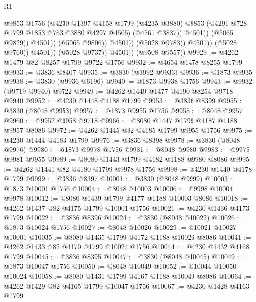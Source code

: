 \begin{lexlean}{R1}
\begin{coremodule}
                                        @9853
                                        @1756
                                        (@4230
                                          @1397
                                          @4158
                                          @1799
                                          (@4235 @3880)
                                          @9853
                                          (@4291 @728 @1799 @1853 @763 @3880 @4297 @4505)
                                          (@4561 @3837))
                                        @4501))
                                    (@5065 @9829))
                                  @4501))
                              (@5065 @9806))
                            @4501))
                        (@5028 @9783))
                      @4501))
                  (@5028 @9760))
                @4501))
            (@5028 @9737))
          @4501))
      (@9508 @9557))
@9929 := @4262 @1479 @82 @8257 @1799 @9722 @1756
@9932 := @4654 @1478 @8255 @1799
@9933 := @3836 @8407
@9935 := @3830 (@3992 @9933)
@9936 := @1873 @9935
@9938 := @3830 (@9936 @6196)
@9940 := @1873 @9938 @1756
@9943 := @9932 (@9719 @9940) @9722
@9949 := @4262 @1449 @1477 @4190 @8254 @9718 @9940
@9952 := @4230 @1448 @4188 @1799
@9953 := @3836 @8399
@9955 := @3830 (@8048 @9953)
@9957 := @1873 @9955 @1756
@9958 := @8048 @9957
@9960 := @9952 @9958 @9718
@9966 := @8080 @1447 @1799 @4187 @1188 @9957 @8086
@9972 := @4262 @1445 @82 @4185 @1799 @9955 @1756
@9975 := @4230 @1444 @4183 @1799
@9976 := @3836 @8398
@9978 := @3830 (@8048 @9976)
@9980 := @1873 @9978 @1756
@9981 := @8048 @9980
@9983 := @9975 @9981 @9955
@9989 := @8080 @1443 @1799 @4182 @1188 @9980 @8086
@9995 := @4262 @1441 @82 @4180 @1799 @9978 @1756
@9998 := @4230 @1440 @4178 @1799
@9999 := @3836 @8397
@10001 := @3830 (@8048 @9999)
@10003 := @1873 @10001 @1756
@10004 := @8048 @10003
@10006 := @9998 @10004 @9978
@10012 := @8080 @1439 @1799 @4177 @1188 @10003 @8086
@10018 := @4262 @1437 @82 @4175 @1799 @10001 @1756
@10021 := @4230 @1436 @4173 @1799
@10022 := @3836 @8396
@10024 := @3830 (@8048 @10022)
@10026 := @1873 @10024 @1756
@10027 := @8048 @10026
@10029 := @10021 @10027 @10001
@10035 := @8080 @1435 @1799 @4172 @1188 @10026 @8086
@10041 := @4262 @1433 @82 @4170 @1799 @10024 @1756
@10044 := @4230 @1432 @4168 @1799
@10045 := @3836 @8395
@10047 := @3830 (@8048 @10045)
@10049 := @1873 @10047 @1756
@10050 := @8048 @10049
@10052 := @10044 @10050 @10024
@10058 := @8080 @1431 @1799 @4167 @1188 @10049 @8086
@10064 := @4262 @1429 @82 @4165 @1799 @10047 @1756
@10067 := @4230 @1428 @4163 @1799

\end{coremodule}
\end{lexlean}
